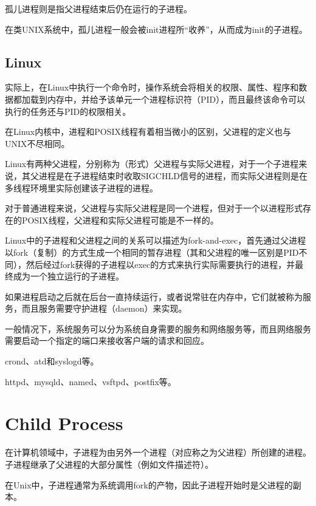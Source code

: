 孤儿进程则是指父进程结束后仍在运行的子进程。

在类UNIX系统中，孤儿进程一般会被init进程所“收养”，从而成为init的子进程。




\subsection{Linux}


实际上，在Linux中执行一个命令时，操作系统会将相关的权限、属性、程序和数据都加载到内存中，并给予该单元一个进程标识符（PID），而且最终该命令可以执行的任务还与PID的权限相关。

在Linux内核中，进程和POSIX线程有着相当微小的区别，父进程的定义也与UNIX不尽相同。


Linux有两种父进程，分别称为（形式）父进程与实际父进程，对于一个子进程来说，其父进程是在子进程结束时收取SIGCHLD信号的进程，而实际父进程则是在多线程环境里实际创建该子进程的进程。


对于普通进程来说，父进程与实际父进程是同一个进程，但对于一个以进程形式存在的POSIX线程，父进程和实际父进程可能是不一样的。

Linux中的子进程和父进程之间的关系可以描述为fork-and-exec，首先通过父进程以fork（复制）的方式生成一个相同的暂存进程（其和父进程的唯一区别是PID不同），然后经过fork获得的子进程以exec的方式来执行实际需要执行的进程，并最终成为一个独立运行的子进程。

如果进程启动之后就在后台一直持续运行，或者说常驻在内存中，它们就被称为服务，而且服务需要守护进程（daemon）来实现。


一般情况下，系统服务可以分为系统自身需要的服务和网络服务等，而且网络服务需要启动一个指定的端口来接收客户端的请求和回应。

\begin{compactitem}
\item crond、atd和syslogd等。
\item httpd、mysqld、named、vsftpd、postfix等。
\end{compactitem}





\section{Child Process}

在计算机领域中，子进程为由另外一个进程（对应称之为父进程）所创建的进程。子进程继承了父进程的大部分属性（例如文件描述符）。

在Unix中，子进程通常为系统调用fork的产物，因此子进程开始时是父进程的副本。



